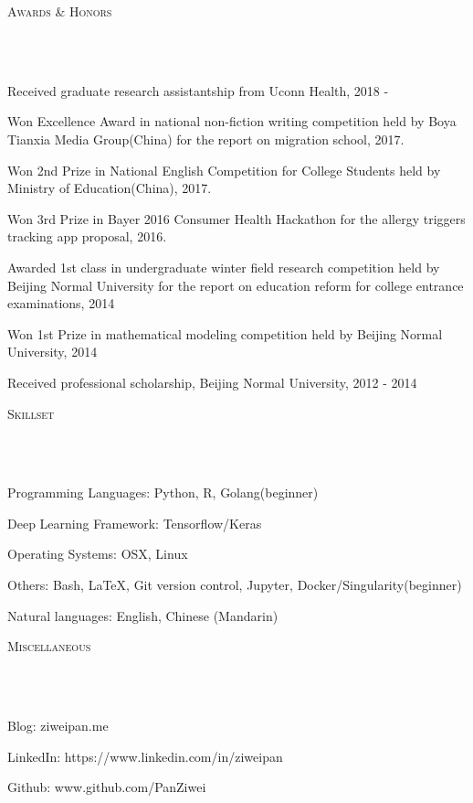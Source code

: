 \documentclass{article}
\newcommand{\header}[1]{{
\hspace*{-15pt}\vspace*{6pt} \textsc{#1}} \vspace*{-6pt} 
\lineunder
}
\newcommand{\lineunder}{
\vspace*{-8pt} \\ \hspace*{-18pt} 
\hrulefill \\
}
\renewcommand{\labelitemii}{
$\vcenter{\hbox{\tiny$\bullet$}}$\hspace*{-3pt}
}
\newenvironment{bullet-list-major}{
\begin{list}{\labelitemii}{\setlength\leftmargin{3pt} 
\topsep 0pt \itemsep -2pt}}{\vspace*{4pt}\end{list}
}
\begin{document}
\vspace*{4pt}%
\header{Awards \& Honors}
    \begin{bullet-list-major}
    \item Received graduate research assistantship from Uconn Health, 2018 -  
    \vspace{2pt}
    \item Won Excellence Award in national non-fiction writing competition held by Boya Tianxia Media Group(China) for the report on migration school, 2017.
    \vspace{2pt}
    \item Won 2nd Prize in National English Competition for College Students held by Ministry of Education(China), 2017.
    \vspace{2pt}
    \item Won 3rd Prize in Bayer 2016 Consumer Health Hackathon for the allergy triggers tracking app proposal, 2016.
    \vspace{2pt}
    \item Awarded 1st class in undergraduate winter field research competition held by Beijing Normal University for the report on education reform for college entrance examinations, 2014
    \vspace{2pt}
    \item Won 1st Prize in mathematical modeling competition held by Beijing Normal University, 2014
    \item Received professional scholarship, Beijing Normal University, 2012 - 2014 
    \end{bullet-list-major}
    
    
\vspace*{4pt}%
\header{Skillset}
    \begin{bullet-list-major}
    \item Programming Languages: Python, R, Golang(beginner)
    \vspace{2pt}
    \item Deep Learning Framework: Tensorflow/Keras
    \vspace{2pt}
    \item Operating Systems: OSX, Linux
    \vspace{2pt}
    \item Others: Bash, LaTeX, Git version control,  Jupyter, Docker/Singularity(beginner)
    \vspace{2pt}
    \item Natural languages: English, Chinese (Mandarin)
    \end{bullet-list-major}


    
\vspace*{4pt}%
\header{Miscellaneous}
    \begin{bullet-list-major}
    \item Blog: ziweipan.me
    \vspace{2pt}
    \item LinkedIn: https://www.linkedin.com/in/ziweipan
    \vspace{2pt}
    \item Github: www.github.com/PanZiwei
    \vspace{2pt}
    \end{bullet-list-major}
\end{document}
